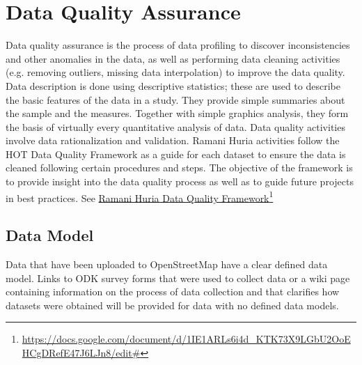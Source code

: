 \documentclass[a4paper,12pt,twoside]{article}
\begin{document}
\section{Data Quality Assurance}
\begin{multicols}{2}
Data quality assurance is the process of data profiling to discover inconsistencies and other anomalies in the data, as well as performing data cleaning activities (e.g. removing outliers, missing data interpolation) to improve the data quality. Data description is done using descriptive statistics; these are used to describe the basic features of the data in a study. They provide simple summaries about the sample and the measures. Together with simple graphics analysis, they form the basis of virtually every quantitative analysis of data. Data quality activities involve data rationalization and validation.
Ramani Huria activities follow the  HOT Data Quality Framework as a guide for each dataset to ensure the data is cleaned following certain procedures and steps. The objective of the framework is to provide insight into the data quality process as well as to guide future projects in best practices.
 See  \href{https://docs.google.com/document/d/1IE1ARLs6i4d_KTK73X9LGbU2OoEHCgDRefE47J6LJn8/edit#}{Ramani Huria Data Quality Framework}\footnote{\url{https://docs.google.com/document/d/1IE1ARLs6i4d_KTK73X9LGbU2OoEHCgDRefE47J6LJn8/edit#}}
\end{multicols}

\subsection{Data Model}
Data that have been uploaded to OpenStreetMap have a clear defined data model. Links to ODK survey forms that were used to collect data or a wiki page containing information on the process of data collection and that clarifies how datasets were obtained will be provided for data with no defined data models.

\newpage
\end{document}

